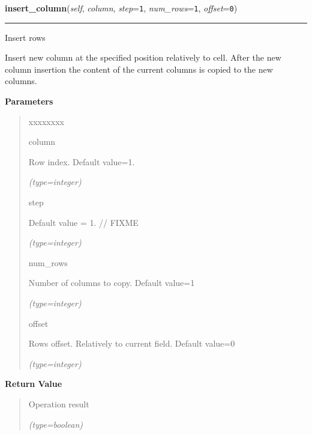     \label{src:pylibratm:Field:insert_column}

    \vspace{0.5ex}

\hspace{.8\funcindent}\begin{boxedminipage}{\funcwidth}

    \raggedright \textbf{insert\_column}(\textit{self}, \textit{column}, \textit{step}={\tt 1}, \textit{num\_rows}={\tt 1}, \textit{offset}={\tt 0})

    \vspace{-1.5ex}

    \rule{\textwidth}{0.5\fboxrule}
\setlength{\parskip}{2ex}
    Insert rows

    Insert new column at the specified position relatively to cell. After 
    the new column insertion the content of the current columns is copied 
    to the new columns.

\setlength{\parskip}{1ex}
      \textbf{Parameters}
      \vspace{-1ex}

      \begin{quote}
        \begin{Ventry}{xxxxxxxx}

          \item[column]

          Row index. Default value=1.

            {\it (type=integer)}

          \item[step]

          Default value = 1.    // FIXME

            {\it (type=integer)}

          \item[num\_rows]

          Number of columns to copy. Default value=1

            {\it (type=integer)}

          \item[offset]

          Rows offset. Relatively to current field. Default value=0

            {\it (type=integer)}

        \end{Ventry}

      \end{quote}

      \textbf{Return Value}
    \vspace{-1ex}

      \begin{quote}
      Operation result

      {\it (type=boolean)}

      \end{quote}

    \end{boxedminipage}

